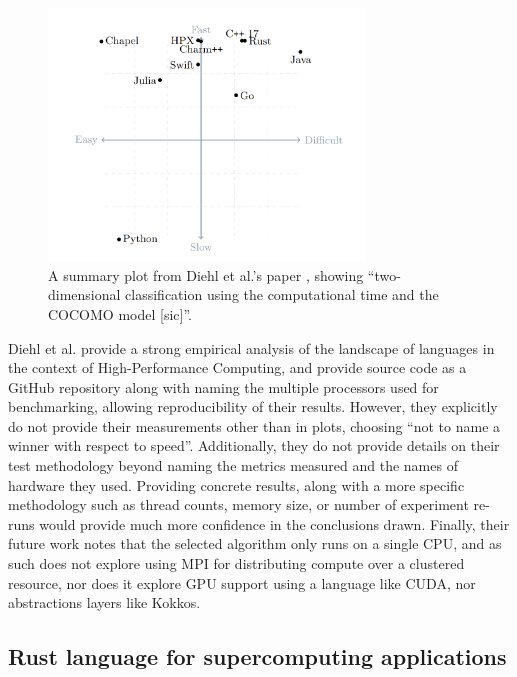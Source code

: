 \begin{figure}[H]
    \centering
    \includegraphics[width=0.75\textwidth]{images/2_background/1d_heat_results.png}
    \caption{A summary plot from Diehl et al.'s paper \cite{diehlBenchmarkingParallel1D2023}, showing ``two-dimensional classification using the computational time and the COCOMO model [sic]''.}
    \label{fig:1d_heat_results}
\end{figure}

Diehl et al. provide a strong empirical analysis of the landscape of languages in the context of High-Performance Computing, and provide source code as a GitHub repository \cite{diehlInitialRelease2023} along with naming the multiple processors used for benchmarking, allowing reproducibility of their results. However, they explicitly do not provide their measurements other than in plots, choosing ``not to name a winner with respect to speed''. Additionally, they do not provide details on their test methodology beyond naming the metrics measured and the names of hardware they used. Providing concrete results, along with a more specific methodology such as thread counts, memory size, or number of experiment re-runs would provide much more confidence in the conclusions drawn. Finally, their future work notes that the selected algorithm only runs on a single CPU, and as such does not explore using MPI for distributing compute over a clustered resource, nor does it explore GPU support using a language like CUDA, nor abstractions layers like Kokkos.

\subsection{Rust language for supercomputing applications}
\label{ssec:bychkov-nikolskiy}

